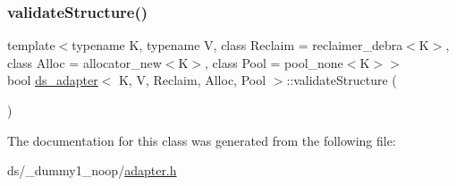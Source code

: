 \mbox{\label{classds__adapter_ae50fe8a8683c0278cdd4c45e1405860d}} 
\subsubsection{\texorpdfstring{validate\+Structure()}{validateStructure()}\hspace{0.1cm}{\footnotesize\ttfamily [26/26]}}
{\footnotesize\ttfamily template$<$typename K, typename V, class Reclaim = reclaimer\+\_\+debra$<$\+K$>$, class Alloc = allocator\+\_\+new$<$\+K$>$, class Pool = pool\+\_\+none$<$\+K$>$$>$ \\
bool \hyperlink{classds__adapter}{ds\+\_\+adapter}$<$ K, V, Reclaim, Alloc, Pool $>$\+::validate\+Structure (\begin{DoxyParamCaption}{ }\end{DoxyParamCaption})\hspace{0.3cm}{\ttfamily [inline]}}



The documentation for this class was generated from the following file\+:\begin{DoxyCompactItemize}
\item 
ds/\+\_\+dummy1\+\_\+noop/\hyperlink{__dummy1__noop_2adapter_8h}{adapter.\+h}\end{DoxyCompactItemize}
